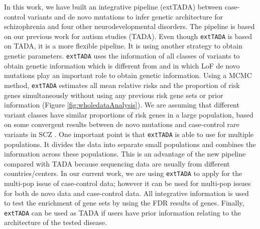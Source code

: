 \documentclass[]{article}
\begin{document}
In this work, we have built an integrative pipeline (extTADA) between
case-control variants and de novo mutations to infer genetic
architecture for schizophrenia and four other neurodevelopmental
disorders. The pipeline is based on our previous work for autism studies (TADA).
Even though \texttt{extTADA} is based on TADA, it is a more flexible pipeline.
It is using another strategy to
obtain genetic parameters. \texttt{extTADA} uses the information of
all classes of variants to obtain genetic information which is
different from \cite{he2013integrated} and  \cite{de2014synaptic} in
which LoF de novo mutations play an important role to obtain genetic
information. Using a MCMC method, \texttt{extTADA} estimates all mean
relative risks and the proportion of risk genes simultaneously without
using any previous risk gene sets or prior information (Figure
\ref{fig:wholedataAnalysis}). We are
assuming that different variant classes have similar proportions
of risk genes in a large population, based on some
convergent results between de novo mutations and case-control rare
variants in SCZ \citep{fromer2014novo, purcell2014polygenic,
  singh2016rare}. One important point is that \texttt{extTADA} is able to use for multiple populations. It divides the data into separate small populations and
combines the information across these populations. This is an
advantage of the new pipeline compared with TADA because sequencing
data are usually from different countries/centers. In our current
work, we are using \texttt{extTADA} to apply for the multi-pop issue of
case-control data; however it can be used for multi-pop issues for
both de novo data and case-control data. All integrative information
is used to test the enrichment of gene sets by using the
FDR results of genes.
Finally, \texttt{extTADA} can be
used as TADA if users have prior information relating to the
architecture of the tested disease.
\end{document}
